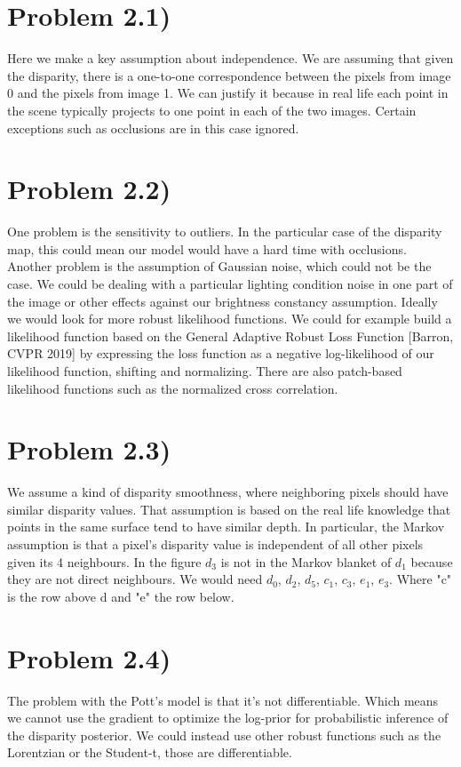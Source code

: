 \documentclass[11pt]{article} %
\begin{document}
	\section*{Problem 2.1)}
 Here we make a key assumption about  independence. We are assuming that given the disparity, there is a one-to-one correspondence between the pixels from image 0 and the pixels from image 1. We can justify it because in real life each point in the scene typically projects to one point in each of the two images. Certain exceptions such as occlusions are in this case ignored.
	
	\section*{Problem 2.2)}
 One problem is the sensitivity to outliers. In the particular case of the disparity map, this could mean our model would have a hard time with  occlusions. Another problem is the assumption of Gaussian noise, which could not be the case. We could be dealing with a particular lighting condition noise in one part of the image or other effects against our brightness constancy assumption.  Ideally we would look for more robust likelihood functions. We could for example build a likelihood function based on the General Adaptive Robust Loss Function [Barron, CVPR 2019] by expressing the loss function as a negative log-likelihood of our likelihood function, shifting and normalizing. There are also patch-based likelihood functions such as the normalized cross correlation.

	\section*{Problem 2.3)}
 We assume a kind of disparity smoothness, where neighboring pixels should have similar disparity values. That assumption is based on the real life knowledge that points in the same surface tend to have similar depth. In particular, the Markov assumption is that a pixel's disparity value is independent of all other pixels given its 4 neighbours. In the figure ${d}_{3}$ is not in the Markov blanket of ${d}_{1}$ because they are not direct neighbours. We would need ${d}_{0}$, ${d}_{2}$, ${d}_{5}$, ${c}_{1}$, ${c}_{3}$, ${e}_{1}$, ${e}_{3}$. Where "c" is the row above d and "e" the row below.

	\section*{Problem 2.4)}
 The problem with the Pott's model is that it's not differentiable. Which means we cannot use the gradient to optimize the log-prior for probabilistic inference of the disparity posterior. We could instead use other robust functions such as the Lorentzian or the Student-t, those are differentiable.
	
\end{document}
